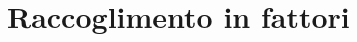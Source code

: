 \chapter{Raccoglimento in fattori}
\label{cha:raccoglimentoinfattori}
\minitoc
\mtcskip                                %
\minilof                                %
\mtcskip                                %
\minilot

